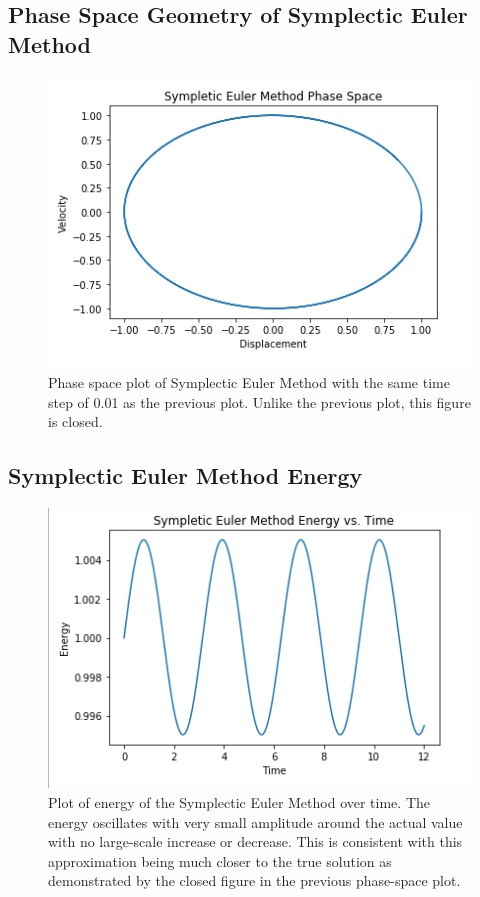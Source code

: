 \documentclass{article}
\begin{document}
\subsection{Phase Space Geometry of Symplectic Euler Method}

\begin{figure}[ht]
\centering
\includegraphics[scale=0.35]{symp_phase.png}
\caption{Phase space plot of Symplectic Euler Method with the same time step of 0.01 as the previous plot. Unlike the previous plot, this figure is closed.}
\label{fig:sympphase}
\end{figure}

\subsection{Symplectic Euler Method Energy}

\begin{figure}[ht]
\centering
\includegraphics[scale=0.35]{symp_energy.png}
\caption{Plot of energy of the Symplectic Euler Method over time. The energy oscillates with very small amplitude around the actual value with no large-scale increase or decrease. This is consistent with this approximation being much closer to the true solution as demonstrated by the closed figure in the previous phase-space plot.}
\label{fig:sympenergy}
\end{figure}
\end{document}

